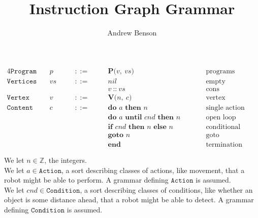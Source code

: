 \documentclass[12pt]{article}
\title{Instruction Graph Grammar}
\author{Andrew Benson}
\date{}
\newcommand{\sort}[1]{\mathtt{#1}}
\newcommand{\syn}[1]{\textbf{#1}}
\newcommand{\nterm}[1]{\mathit{#1}}
\newcommand{\prog}[2]{\syn{P(}#1,\ #2\syn{)}}
\newcommand{\cons}[2]{#1\ \syn{::}\ #2}
\newcommand{\ver}[2]{\syn{V(}#1,\ #2\syn{)}}
\newcommand{\doonce}[2]{\syn{do }#1\syn{ then }#2}
\newcommand{\dountil}[3]{\syn{do }#1\syn{ until }#2\syn{ then }#3}
\newcommand{\ifelse}[3]{\syn{if }#1\syn{ then }#2\syn{ else }#3}
\newcommand{\goto}[1]{\syn{goto }#1}
\newcommand{\progend}[0]{\syn{end}}
\begin{document}
\maketitle

\begin{alignat*}{4}
  \sort{Program}\quad
    &\nterm{p}\quad & &::=\quad &
      &\prog{\nterm{v}}{\nterm{vs}}\qquad & &\text{programs}\\
  \sort{Vertices}\quad
    &\nterm{vs}\quad & &::=\quad &
      &\nterm{nil}\qquad & &\text{empty}\\
  &&&&&\cons{\nterm{v}}{\nterm{vs}}\qquad & &\text{cons}\\
  \sort{Vertex}\quad
    &\nterm{v}\quad & &::=\quad &
      &\ver{\nterm{n}}{\nterm{c}}\qquad & &\text{vertex}\\
  \sort{Content}\quad
    &\nterm{c}\quad & &::=\quad &
      &\doonce{\nterm{a}}{\nterm{n}}\qquad & &\text{single action}\\
  &&&&&\dountil{\nterm{a}}{\nterm{cnd}}{\nterm{n}}\qquad & &\text{open loop action}\\
  &&&&&\ifelse{\nterm{cnd}}{\nterm{n}}{\nterm{n}}\qquad & & \text{conditional}\\
  &&&&&\goto{\nterm{n}}\qquad & &\text{goto}\\
  &&&&&\progend\qquad & &\text{termination}
\end{alignat*}

We let $\nterm{n} \in \mathbb{Z}$, the integers.\\

We let $\nterm{a} \in \sort{Action}$, a sort describing classes of actions,
like movement, that a robot might be able to perform. A grammar defining
$\sort{Action}$ is assumed.\\

We let $\nterm{cnd} \in \sort{Condition}$, a sort describing classes of
conditions, like whether an object is some distance ahead, that a robot might be
able to detect. A grammar defining $\sort{Condition}$ is assumed.\\
\end{document}
